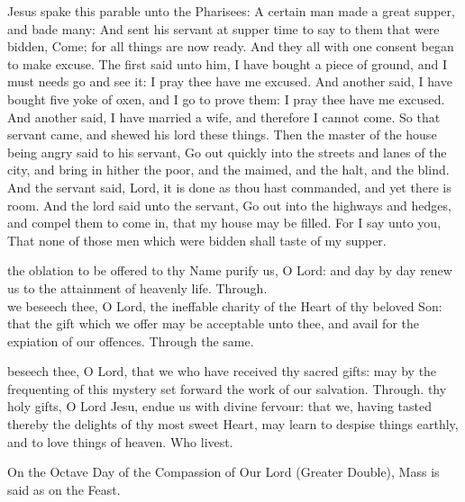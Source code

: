  Jesus spake this parable unto the Pharisees: A certain man made a great supper, and bade many: And sent his servant at supper time to say to them that were bidden, Come; for all things are now ready. And they all with one consent began to make excuse. The first said unto him, I have bought a piece of ground, and I must needs go and see it: I pray thee have me excused. And another said, I have bought five yoke of oxen, and I go to prove them: I pray thee have me excused. And another said, I have married a wife, and therefore I cannot come. So that servant came, and shewed his lord these things. Then the master of the house being angry said to his servant, Go out quickly into the streets and lanes of the city, and bring in hither the poor, and the maimed, and the halt, and the blind. And the servant said, Lord, it is done as thou hast commanded, and yet there is room. And the lord said unto the servant, Go out into the highways and hedges, and compel them to come in, that my house may be filled. For I say unto you, That none of those men which were bidden shall taste of my supper.


\secret
{} the oblation to be offered to thy Name purify us, O Lord: and day by day renew us to the attainment of heavenly life. Through.\\

 we beseech thee, O Lord, the ineffable charity of the Heart of thy beloved Son: that the gift which we offer may be acceptable unto thee, and avail for the expiation of our offences. Through the same.


\postcommunion
{} beseech thee, O Lord, that we who have received thy sacred gifts: may by the frequenting of this mystery set forward the work of our salvation. Through.
 thy holy gifts, O Lord Jesu, endue us with divine fervour: that we, having tasted thereby the delights of thy most sweet Heart, may learn to despise things earthly, and to love things of heaven. Who livest.
\begin{rubric}
    On the Octave Day of the Compassion of Our Lord (Greater Double), Mass is said as on the Feast.
\end{rubric}

